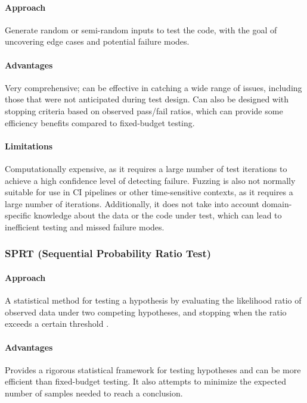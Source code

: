
        \paragraph{Approach} Generate random or semi-random inputs to test the code, with the goal of uncovering edge cases and potential failure modes.

        \paragraph{Advantages} Very comprehensive; can be effective in catching a wide range of issues, including those that were not anticipated during test design. Can also be designed with stopping criteria based on observed pass/fail ratios, which can provide some efficiency benefits compared to fixed-budget testing.

        \paragraph{Limitations} Computationally expensive, as it requires a large number of test iterations to achieve a high confidence level of detecting failure. Fuzzing is also not normally suitable for use in CI pipelines or other time-sensitive contexts, as it requires a large number of iterations. Additionally, it does not take into account domain-specific knowledge about the data or the code under test, which can lead to inefficient testing and missed failure modes.

    \subsubsection{SPRT (Sequential Probability Ratio Test)}

        \paragraph{Approach} A statistical method for testing a hypothesis by evaluating the likelihood ratio of observed data under two competing hypotheses, and stopping when the ratio exceeds a certain threshold \cite{wald1945sequential}.

        \paragraph{Advantages} Provides a rigorous statistical framework for testing hypotheses and can be more efficient than fixed-budget testing. It also attempts to minimize the expected number of samples needed to reach a conclusion.


